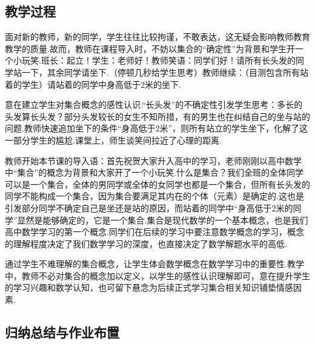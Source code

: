 \subsection{教学过程}
\begin{intro}
	面对新的教师，新的同学，学生往往比较拘谨，不敢表达，这无疑会影响教师教育教学的质量.故而，教师在课程导入时，不妨以集合的“确定性”为背景和学生开一个小玩笑.班长：起立！学生：老师好！教师笑语：同学们好！请所有长头发的同学站一下，其余同学请坐下.（停顿几秒给学生思考）教师继续：（目测包含所有站着的学生）请站着的同学中身高低于2米的坐下.
\end{intro}
\begin{purpose}
	意在建立学生对集合概念的感性认识.“长头发”的不确定性引发学生思考：多长的头发算长头发？部分头发较长的女生不知所措，有的男生也在纠结自己的坐与站的问题.教师快速追加坐下的条件“身高低于2米”，则所有站立的学生坐下，化解了这一部分学生的尴尬.课堂上，师生谈笑间拉近了心理的距离.
\end{purpose}

\begin{intro}
	教师开始本节课的导入语：首先祝贺大家升入高中的学习，老师刚刚以高中数学中“集合”的概念为背景和大家开了一个小玩笑.什么是集合？我们全班的全体同学可以是一个集合，全体的男同学或全体的女同学也都是一个集合，但所有长头发的同学不能构成一个集合，因为集合要满足其内在的个体（元素）是确定的.这也是引发部分同学不确定自己是坐还是站的原因，而站着的同学中“身高低于2米的同学”显然是能够确定的，它是一个集合.集合是现代数学的一个基本概念，也是我们高中数学学习的第一个概念.同学们在后续的学习中要注意数学概念的学习，概念的理解程度决定了我们数学学习的深度，也直接决定了数学解题水平的高低.
\end{intro}
\begin{purpose}
	通过学生不难理解的集合概念，让学生体会数学概念在数学学习中的重要性.教学中，教师不必对集合的概念加以定义，以学生的感性认识理解即可，意在提升学生的学习兴趣和数学认知，也可留下悬念为后续正式学习集合相关知识铺垫情感因素.
\end{purpose}

\subsection{归纳总结与作业布置}

